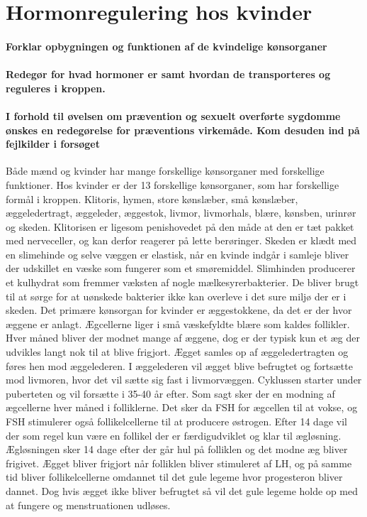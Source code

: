 \newpage
\part{Hormonregulering hos kvinder}
\subsection*{Forklar opbygningen og funktionen af de kvindelige kønsorganer}
\subsection*{Redegør for hvad hormoner er samt hvordan de transporteres og reguleres i kroppen.}
\subsection*{I forhold til øvelsen om prævention og sexuelt overførte sygdomme ønskes en redegørelse for præventions virkemåde. Kom desuden ind på fejlkilder i forsøget}
Både mænd og kvinder har mange forskellige kønsorganer med forskellige funktioner. Hos kvinder er der 13 forskellige kønsorganer, som har forskellige formål i kroppen. Klitoris, hymen, store kønslæber, små kønslæber, æggeledertragt, æggeleder, æggestok, livmor, livmorhals, blære, kønsben, urinrør og skeden. Klitorisen er ligesom penishovedet på den måde at den er tæt pakket med nerveceller, og kan derfor reagerer på lette berøringer. Skeden er klædt med en slimehinde og selve væggen er elastisk, når en kvinde indgår i samleje bliver der udskillet en væske som fungerer som et smøremiddel. Slimhinden producerer et kulhydrat som fremmer væksten af nogle mælkesyrerbakterier. De bliver brugt til at sørge for at uønskede bakterier ikke kan overleve i det sure miljø der er i skeden. Det primære kønsorgan for kvinder er æggestokkene, da det er der hvor æggene er anlagt. Ægcellerne liger i små væskefyldte blære som kaldes follikler. Hver måned bliver der modnet mange af æggene, dog er der typisk kun et æg der udvikles langt nok til at blive frigjort. Ægget samles op af æggeledertragten og føres hen mod æggelederen. I æggelederen vil ægget blive befrugtet og fortsætte mod livmoren, hvor det vil sætte sig fast i livmorvæggen. 
Cyklussen starter under puberteten og vil forsætte i 35-40 år efter. Som sagt sker der en modning af ægcellerne hver måned i folliklerne. Det sker da FSH for ægcellen til at vokse, og FSH stimulerer også follikelcellerne til at producere østrogen. Efter 14 dage vil der som regel kun være en follikel der er færdigudviklet og klar til ægløsning. Ægløsningen sker 14 dage efter der går hul på folliklen og det modne æg bliver frigivet. Ægget bliver frigjort når folliklen bliver stimuleret af LH, og på samme tid bliver follikelcellerne omdannet til det gule legeme hvor progesteron bliver dannet. Dog hvis ægget ikke bliver befrugtet så vil det gule legeme holde op med at fungere og menstruationen udløses.

